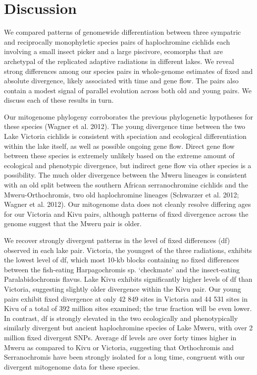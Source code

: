 \section{Discussion}

We compared patterns of genomewide differentiation between three sympatric and reciprocally monophyletic species pairs of haplochromine cichlids each involving a small insect picker and a large piscivore, ecomorphs that are archetypal of the replicated adaptive radiations in different lakes. We reveal strong differences among our species pairs in whole-genome estimates of fixed and absolute divergence, likely associated with time and gene flow. The pairs also contain a modest signal of parallel evolution across both old and young pairs. We discuss each of these results in turn.

Our mitogenome phylogeny corroborates the previous phylogenetic hypotheses for these species (Wagner et al. 2012). The young divergence time between the two Lake Victoria cichlids is consistent with speciation and ecological differentiation within the lake itself, as well as possible ongoing gene flow. Direct gene flow between these species is extremely unlikely based on the extreme amount of ecological and phenotypic divergence, but indirect gene flow via other species is a possibility. The much older divergence between the Mweru lineages is consistent with an old split between the southern African serranochromine cichlids and the Mweru-Orthochromis, two old haplochromine lineages (Schwarzer et al. 2012; Wagner et al. 2012). Our mitogenome data does not cleanly resolve differing ages for our Victoria and Kivu pairs, although patterns of fixed divergence across the genome suggest that the Mweru pair is older.

We recover strongly divergent patterns in the level of fixed differences (df) observed in each lake pair. Victoria, the youngest of the three radiations, exhibits the lowest level of df, which most 10-kb blocks containing no fixed differences between the fish-eating Harpagochromis sp. ‘checkmate’ and the insect-eating Paralabidochromis flavus. Lake Kivu exhibits significantly higher levels of df than Victoria, suggesting slightly older divergence within the Kivu pair. Our young pairs exhibit fixed divergence at only 42 849 sites in Victoria and 44 531 sites in Kivu of a total of 392 million sites examined; the true fraction will be even lower. In contrast, df is strongly elevated in the two ecologically and phenotypically similarly divergent but ancient haplochromine species of Lake Mweru, with over 2 million fixed divergent SNPs. Average df levels are over forty times higher in Mweru as compared to Kivu or Victoria, suggesting that Orthochromis and Serranochromis have been strongly isolated for a long time, congruent with our divergent mitogenome data for these species.

